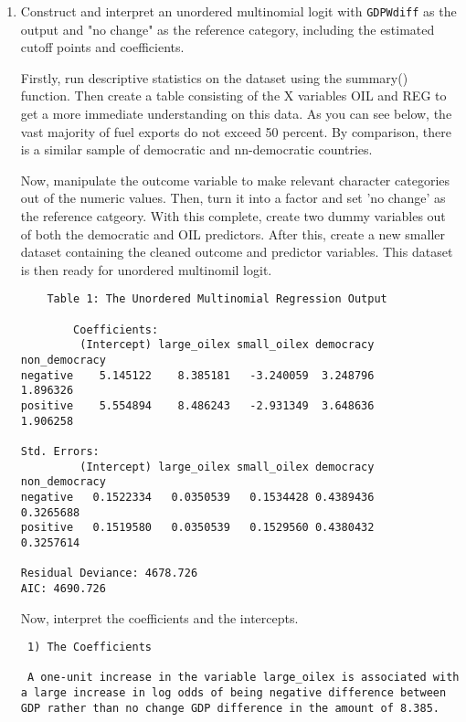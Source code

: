 \documentclass[12pt,letterpaper]{article}
\begin{document}
\begin{enumerate}
	\item Construct and interpret an unordered multinomial logit with \texttt{GDPWdiff} as the output and "no change" as the reference category, including the estimated cutoff points and coefficients.

Firstly, run descriptive statistics on the dataset using the summary() function. Then create a table consisting of the X variables OIL and REG to get a more immediate understanding on this data. As you can see below, the vast majority of fuel exports do not exceed 50 percent. By comparison, there is a similar sample of democratic and nn-democratic countries. 
	
		 
	
Now, manipulate the outcome variable to make relevant character categories out of the numeric values. Then, turn it into a factor and set 'no  change' as the reference catgeory. With this complete, create two dummy variables out of both the democratic and OIL predictors. After this, create a new smaller dataset containing the cleaned outcome and predictor variables. This dataset is then ready for unordered multinomil logit.  
 
 	 
 	
 		\begin{verbatim}
 	Table 1: The Unordered Multinomial Regression Output 
 	
 		Coefficients:
         (Intercept) large_oilex small_oilex democracy non_democracy
negative    5.145122    8.385181   -3.240059  3.248796      1.896326
positive    5.554894    8.486243   -2.931349  3.648636      1.906258

Std. Errors:
         (Intercept) large_oilex small_oilex democracy non_democracy
negative   0.1522334   0.0350539   0.1534428 0.4389436     0.3265688
positive   0.1519580   0.0350539   0.1529560 0.4380432     0.3257614

Residual Deviance: 4678.726 
AIC: 4690.726 
 	\end{verbatim}
 
 Now, interpret the coefficients and the intercepts. 
 
 	\begin{verbatim}
 1) The Coefficients
 
 A one-unit increase in the variable large_oilex is associated with a large increase in log odds of being negative difference between GDP rather than no change GDP difference in the amount of 8.385.


\end{verbatim}
\end{enumerate}
\end{document}
